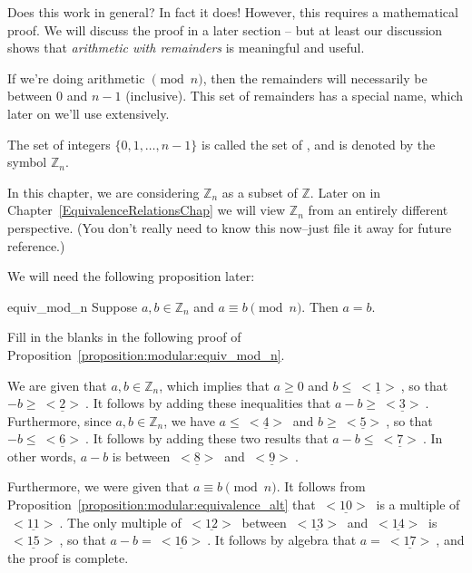 Does this work in general? In fact it does! However, this requires a mathematical proof.  We will discuss the proof in a later section -- but at least our discussion shows that \emph{arithmetic with remainders} is meaningful and useful.

If we're doing arithmetic $\pmod{n}$, then the remainders will necessarily be between $0$ and $n-1$ (inclusive). This set of  remainders has a special name, which later on we'll use extensively.

\begin{defn}\label{integers_mod_n}
The set of integers $\{0,1,\ldots,n-1\}$ is called the set of , and is denoted by the symbol ${\mathbb Z}_n$.
\end{defn}

\begin{rem}
In this chapter, we are considering ${\mathbb Z}_n$ as a subset of $\mathbb{Z}$. Later on in Chapter~\ref{EquivalenceRelationsChap} we will view ${\mathbb Z}_n$ from an entirely different perspective. (You don't really need to know this now--just file it away for future reference.)
\end{rem}

We will need the following proposition later:

\begin{prop}{equiv_mod_n}
Suppose $a,b \in  {\mathbb Z}_n$ and $a \equiv b \pmod{n}$. Then $a = b$.
\end{prop}

\begin{exercise}{27} 
Fill in the blanks in the following proof of Proposition~\ref{proposition:modular:equiv_mod_n}.

\noindent
We are given that $a,b \in  {\mathbb Z}_n$, which implies that $a \geq 0$ and $b \leq  \underline{~<1>~}$, so that $-b \geq  \underline{~<2>~}$.
It follows by adding these inequalities that $a - b \geq   \underline{~<3>~}$. 
Furthermore, since $a,b \in  {\mathbb Z}_n$, we have $a \leq \underline{~<4>~}$ and $b \geq  \underline{~<5>~}$, so that $-b \leq  \underline{~<6>~}$.
It follows by adding these two results that $a - b \leq  \underline{~<7>~}$. In other words,  $a - b$ is between $\underline{~<8>~}$ and $\underline{~<9>~}$. 

Furthermore, we were given that $a \equiv b \pmod{n}$. It follows from Proposition~\ref{proposition:modular:equivalence_alt} that $\underline{~<10>~}$ is  a multiple of $\underline{~<11>~}$. 
The only multiple of $\underline{~<12>~}$ between $\underline{~<13>~}$ and $\underline{~<14>~}$ is $\underline{~<15>~}$, so that $a - b = \underline{~<16>~}$. It follows by algebra that $a = \underline{~<17>~}$, and the proof is complete.
\end{exercise}


